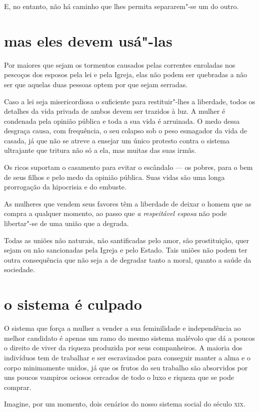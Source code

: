 E, no entanto, não há caminho que lhes permita separarem"-se um do outro.

\section{mas eles devem usá"-las}

Por maiores que sejam os tormentos causados pelas correntes
enroladas nos pescoços dos esposos pela lei e pela Igreja, elas não podem ser quebradas
a não ser que aquelas duas pessoas optem por que sejam serradas.

Caso a lei seja misericordiosa o suficiente para restituir"-lhes a liberdade,
todos os detalhes da vida privada de ambos devem ser
trazidos à luz. A mulher é condenada pela opinião pública e toda a sua
vida é arruinada. O medo dessa desgraça causa, com frequência, o
seu colapso sob o peso esmagador da vida de casada, já que não se atreve
a ensejar um único protesto contra o sistema ultrajante que tritura não
só a ela, mas muitas das suas irmãs.

Os ricos suportam o casamento para evitar o escândalo --- os pobres, para
o bem de seus filhos e pelo medo da opinião pública. Suas vidas são uma
longa prorrogação da hipocrisia e do embuste.

As mulheres que vendem seus favores têm a liberdade de deixar o homem
que as compra a qualquer momento, ao passo que \textit{a respeitável esposa}
não pode libertar"-se de uma união que a degrada.

Todas as uniões não naturais, não santificadas pelo amor, são
prostituição, quer sejam ou não sancionadas pela Igreja e pelo Estado.
Tais uniões não podem ter outra consequência que não seja a de degradar
tanto a moral, quanto a saúde da sociedade.

\section{o sistema é culpado}

O sistema que força a mulher a vender a sua feminilidade e independência
ao melhor candidato é apenas um ramo do mesmo sistema malévolo que dá a poucos
o direito de viver da riqueza produzida por seus companheiros. A maioria dos indivíduos tem de 
trabalhar e ser escravizados para
conseguir manter a alma e o corpo minimamente unidos, já que os frutos
do seu trabalho são absorvidos por uns poucos vampiros ociosos cercados
de todo o luxo e riqueza que se pode comprar.

Imagine, por um momento, dois cenários do nosso sistema social do século \textsc{xix}.

